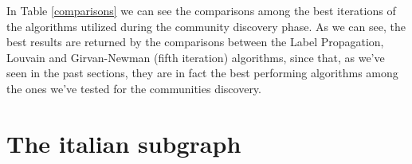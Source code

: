     In Table \ref{comparisons} we can see the comparisons among the best iterations of the algorithms utilized
    during the community discovery phase. As we can see, the best results are returned by the comparisons between
    the Label Propagation, Louvain and Girvan-Newman (fifth iteration) algorithms, since that, as we've seen in
    the past sections, they are in fact the best performing algorithms among the ones we've tested for the
    communities discovery.

\section{The italian subgraph} %
\label{sec:the_italian_subgraph}


